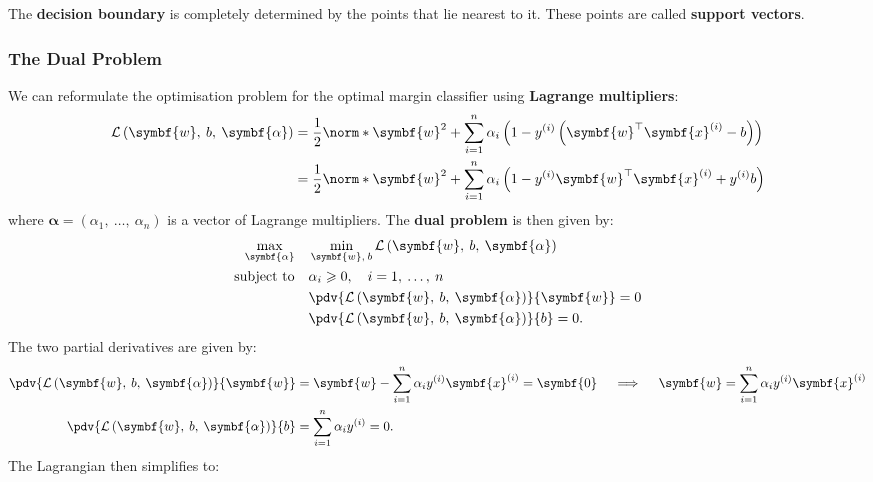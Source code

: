 \documentclass{article}
\begin{document}
The \textbf{decision boundary} is completely determined by the points
that lie nearest to it. These points are called \textbf{support vectors}.
\subsubsection{The Dual Problem}
We can reformulate the optimisation problem for the optimal margin
classifier using \textbf{Lagrange multipliers}:
\begin{align*}
    \mathcal{L}\left( \symbf{w},\: b,\: \symbf{\alpha} \right) & = \frac{1}{2}\norm*{\symbf{w}}^2 + \sum_{i = 1}^n \alpha_i \left( 1 - y^{\left( i \right)} \left( \symbf{w}^\top \symbf{x}^{\left( i \right)} - b \right) \right)       \\
                                                               & = \frac{1}{2}\norm*{\symbf{w}}^2 + \sum_{i = 1}^n \alpha_i \left( 1 - y^{\left( i \right)} \symbf{w}^\top \symbf{x}^{\left( i \right)} + y^{\left( i \right)} b \right)
\end{align*}
where \(\symbf{\alpha} = \left( \alpha_1,\: \dots,\: \alpha_n \right)\)
is a vector of Lagrange multipliers. The \textbf{dual problem} is then
given by:
\begin{align*}
    \max_{\symbf{\alpha}} \quad & \min_{\symbf{w},\: b} \mathcal{L}\left( \symbf{w},\: b,\: \symbf{\alpha} \right) \\
    \text{subject to} \quad     & \alpha_i \geqslant 0, \quad i = 1,\: \dots,\: n                                  \\
                                & \pdv{\mathcal{L}\left( \symbf{w},\: b,\: \symbf{\alpha} \right)}{\symbf{w}} = 0  \\
                                & \pdv{\mathcal{L}\left( \symbf{w},\: b,\: \symbf{\alpha} \right)}{b} = 0.
\end{align*}
The two partial derivatives are given by:
\begin{align*}
    \pdv{\mathcal{L}\left( \symbf{w},\: b,\: \symbf{\alpha} \right)}{\symbf{w}} & = \symbf{w} - \sum_{i = 1}^n \alpha_i y^{\left( i \right)} \symbf{x}^{\left( i \right)} = \symbf{0} \quad \implies \quad \symbf{w} = \sum_{i = 1}^n \alpha_i y^{\left( i \right)} \symbf{x}^{\left( i \right)} \\
    \pdv{\mathcal{L}\left( \symbf{w},\: b,\: \symbf{\alpha} \right)}{b}         & = \sum_{i = 1}^n \alpha_i y^{\left( i \right)} = 0.
\end{align*}
The Lagrangian then simplifies to:
\end{document}

